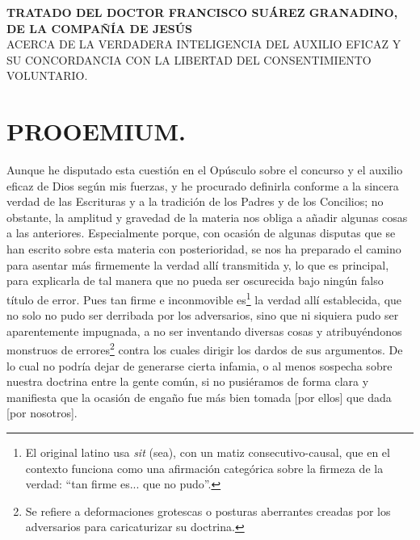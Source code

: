 \documentclass{article}
\begin{document}
\newpage

\hypertarget{toc_target}{}

\tableofcontents
\newpage

\begin{center}
    \textbf{TRATADO DEL DOCTOR FRANCISCO SUÁREZ GRANADINO, DE LA COMPAÑÍA DE JESÚS}\\
    ACERCA DE LA VERDADERA INTELIGENCIA DEL AUXILIO EFICAZ Y SU CONCORDANCIA CON LA
    LIBERTAD DEL CONSENTIMIENTO VOLUNTARIO.
\end{center}

\section{PROOEMIUM.}
Aunque he disputado esta cuestión en el Opúsculo sobre el concurso y el auxilio eficaz
de Dios según mis fuerzas, y he procurado definirla conforme a la sincera verdad de las
Escrituras y a la tradición de los Padres y de los Concilios; no obstante, la amplitud y
gravedad de la materia nos obliga a añadir algunas cosas a las anteriores. Especialmente
porque, con ocasión de algunas disputas que se han escrito sobre esta materia con
posterioridad, se nos ha preparado el camino para asentar más firmemente la verdad allí
transmitida y, lo que es principal, para explicarla de tal manera que no pueda ser
oscurecida bajo ningún falso título de error. Pues tan firme e inconmovible
es\footnote{El original latino usa \textit{sit} (sea), con un matiz consecutivo-causal,
que en el contexto funciona como una afirmación categórica sobre la firmeza de la
verdad: \enquote{tan firme es... que no pudo}.} la verdad allí establecida, que no solo
no pudo ser derribada por los adversarios, sino que ni siquiera pudo ser aparentemente
impugnada, a no ser inventando diversas cosas y atribuyéndonos monstruos de
errores\footnote{Se refiere a deformaciones grotescas o posturas aberrantes creadas por
los adversarios para caricaturizar su doctrina.} contra los cuales dirigir los dardos de
sus argumentos. De lo cual no podría dejar de generarse cierta infamia, o al menos
sospecha sobre nuestra doctrina entre la gente común, si no pusiéramos de forma clara y
manifiesta que la ocasión de engaño fue más bien tomada [por ellos] que dada [por
nosotros].
\end{document}
